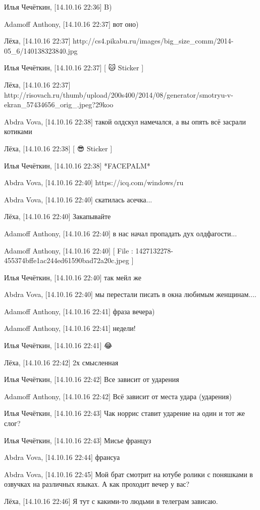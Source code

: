 Илья Чечёткин, [14.10.16 22:36]
B)

Adamoff Anthony, [14.10.16 22:37]
вот оно)

Лёха, [14.10.16 22:37]
http://cs4.pikabu.ru/images/big_size_comm/2014-05_6/140138323840.jpg

Илья Чечёткин, [14.10.16 22:37]
[ 🐱 Sticker ]

Лёха, [14.10.16 22:37]
http://risovach.ru/thumb/upload/200s400/2014/08/generator/smotryu-v-ekran_57434656_orig_.jpeg?29koo

Abdra Vova, [14.10.16 22:38]
такой олдскул намечался, а вы опять всё засрали котиками

Лёха, [14.10.16 22:38]
[ 😎 Sticker ]

Илья Чечёткин, [14.10.16 22:38]
*FACEPALM*

Abdra Vova, [14.10.16 22:40]
https://icq.com/windows/ru

Abdra Vova, [14.10.16 22:40]
скатилась асечка...

Лёха, [14.10.16 22:40]
Закапывайте

Adamoff Anthony, [14.10.16 22:40]
в нас начал пропадать дух олдфагости...

Adamoff Anthony, [14.10.16 22:40]
[ File : 1427132278-455374bffe1ac244ed61590bad72a20c.jpeg ]

Илья Чечёткин, [14.10.16 22:40]
так мейл же

Abdra Vova, [14.10.16 22:40]
мы перестали писать в окна любимым женщинам....

Adamoff Anthony, [14.10.16 22:41]
фраза вечера)

Adamoff Anthony, [14.10.16 22:41]
недели!

Илья Чечёткин, [14.10.16 22:41]
😂

Лёха, [14.10.16 22:42]
2х смысленная

Илья Чечёткин, [14.10.16 22:42]
Все зависит от ударения

Adamoff Anthony, [14.10.16 22:42]
Всё зависит от места удара (ударения)

Илья Чечёткин, [14.10.16 22:43]
Чак норрис ставит ударение на один и тот же слог?

Илья Чечёткин, [14.10.16 22:43]
Мисье француз

Abdra Vova, [14.10.16 22:44]
франсуа

Abdra Vova, [14.10.16 22:45]
Мой брат смотрит на ютубе ролики с поняшками в озвучках на различных языках. А как проходит вечер у вас?

Лёха, [14.10.16 22:46]
Я тут с какими-то людьми в телеграм зависаю.

